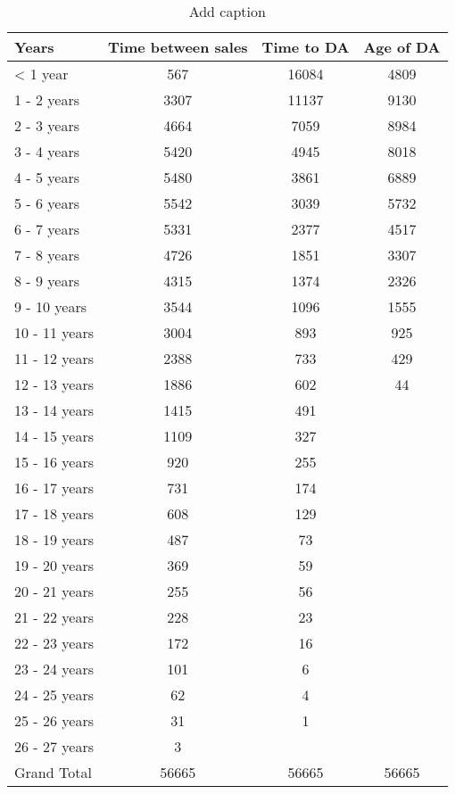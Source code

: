 \begin{table}[!htb]
  \centering
  \caption{Add caption}
    \begin{tabular}{lccc}
    \hline \hline
    Years & Time between sales & Time to DA & Age of DA \\
    \hline
    < 1 year & 567   & 16084 & 4809 \\
    1 - 2 years & 3307  & 11137 & 9130 \\
    2 - 3 years & 4664  & 7059  & 8984 \\
    3 - 4 years & 5420  & 4945  & 8018 \\
    4 - 5 years & 5480  & 3861  & 6889 \\
    5 - 6 years & 5542  & 3039  & 5732 \\
    6 - 7 years & 5331  & 2377  & 4517 \\
    7 - 8 years & 4726  & 1851  & 3307 \\
    8 - 9 years & 4315  & 1374  & 2326 \\
    9 - 10 years & 3544  & 1096  & 1555 \\
    10 - 11 years & 3004  & 893   & 925 \\
    11 - 12 years & 2388  & 733   & 429 \\
    12 - 13 years & 1886  & 602   & 44 \\
    13 - 14 years & 1415  & 491   &  \\
    14 - 15 years & 1109  & 327   &  \\
    15 - 16 years & 920   & 255   &  \\
    16 - 17 years & 731   & 174   &  \\
    17 - 18 years & 608   & 129   &  \\
    18 - 19 years & 487   & 73    &  \\
    19 - 20 years & 369   & 59    &  \\
    20 - 21 years & 255   & 56    &  \\
    21 - 22 years & 228   & 23    &  \\
    22 - 23 years & 172   & 16    &  \\
    23 - 24 years & 101   & 6     &  \\
    24 - 25 years & 62    & 4     &  \\
    25 - 26 years & 31    & 1     &  \\
    26 - 27 years & 3     &       &  \\
    Grand Total & 56665 & 56665 & 56665 \\
    \hline
    \end{tabular}%
  \label{tab:addlabel}%
\end{table}%
